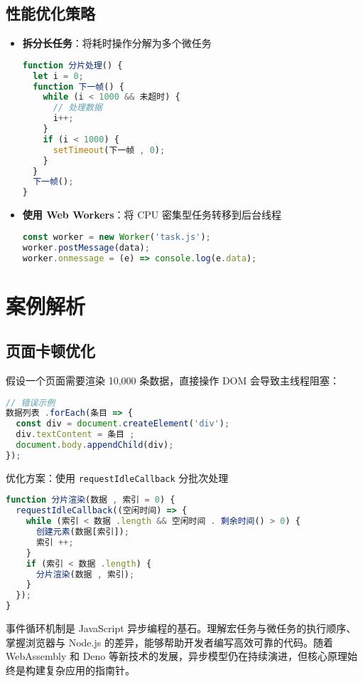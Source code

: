 \section{性能优化策略}
\begin{itemize}
\item \textbf{拆分长任务}：将耗时操作分解为多个微任务\begin{lstlisting}[language=javascript]
function 分片处理() {
  let i = 0;
  function 下一帧() {
    while (i < 1000 && 未超时) {
      // 处理数据
      i++;
    }
    if (i < 1000) {
      setTimeout(下一帧 , 0);
    }
  }
  下一帧();
}
\end{lstlisting}

\item \textbf{使用 Web Workers}：将 CPU 密集型任务转移到后台线程\begin{lstlisting}[language=javascript]
const worker = new Worker('task.js');
worker.postMessage(data);
worker.onmessage = (e) => console.log(e.data);
\end{lstlisting}

\end{itemize}
\chapter{案例解析}
\section{页面卡顿优化}
假设一个页面需要渲染 10,000 条数据，直接操作 DOM 会导致主线程阻塞：\par
\begin{lstlisting}[language=javascript]
// 错误示例
数据列表 .forEach(条目 => {
  const div = document.createElement('div');
  div.textContent = 条目 ;
  document.body.appendChild(div);
});
\end{lstlisting}
优化方案：使用 \verb!requestIdleCallback! 分批次处理\par
\begin{lstlisting}[language=javascript]
function 分片渲染(数据 , 索引 = 0) {
  requestIdleCallback((空闲时间) => {
    while (索引 < 数据 .length && 空闲时间 . 剩余时间() > 0) {
      创建元素(数据[索引]);
      索引 ++;
    }
    if (索引 < 数据 .length) {
      分片渲染(数据 , 索引);
    }
  });
}
\end{lstlisting}
事件循环机制是 JavaScript 异步编程的基石。理解宏任务与微任务的执行顺序、掌握浏览器与 Node.js 的差异，能够帮助开发者编写高效可靠的代码。随着 WebAssembly 和 Deno 等新技术的发展，异步模型仍在持续演进，但核心原理始终是构建复杂应用的指南针。\par
